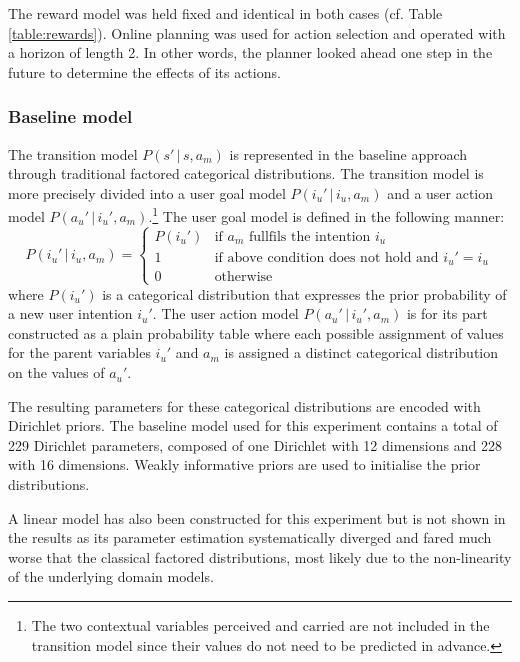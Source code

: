 The reward model was held fixed and identical in both cases (cf. Table \ref{table:rewards}). Online planning was used for action selection and operated with a horizon of length 2. In other words, the planner looked ahead one step in the future to determine the effects of its actions.  




\subsubsection*{Baseline model}

The transition model $P(s'\, | \, s, a_m)$ is represented in the baseline approach through traditional factored categorical distributions. The transition model is more precisely divided into a user goal model $P(i_u'\, | \, i_u, a_m)$ and a user action model $P(a_u' \, | \, i_u',a_m)$.\footnote{The two contextual variables $\mathrm{perceived}$ and $\mathrm{carried}$ are not included in the transition model since their values do not need to be predicted in advance.} The user goal model is defined in the following manner:
\begin{equation}
P(i_u' \, | \, i_u, a_m) = \begin{cases}
P(i_u') & \text{if } a_m \text{ fullfils the intention } i_u \\
1 & \text{if above condition does not hold and } i_u' = i_u \\
0 & \text{otherwise} \end{cases} \nonumber
\end{equation}
where $P(i_u')$ is a categorical distribution that expresses the prior probability of a new user intention $i_u'$. The user action model $P(a_u' \, | \, i_u',a_m)$ is for its part constructed as a plain probability table where each possible assignment of values for the parent variables $i_u'$ and $a_m$ is assigned a distinct categorical distribution on the values of $a_u'$. 

The resulting parameters for these categorical distributions are encoded with Dirichlet priors.  The baseline model used for this experiment contains a total of 229 Dirichlet parameters, composed of one Dirichlet with 12 dimensions and 228 with 16 dimensions.  Weakly informative priors are used to initialise the prior distributions.

A linear model has also been constructed for this experiment but is not shown in the results as its parameter estimation systematically diverged and fared much worse that the classical factored distributions, most likely due to the non-linearity of the underlying domain models. 


